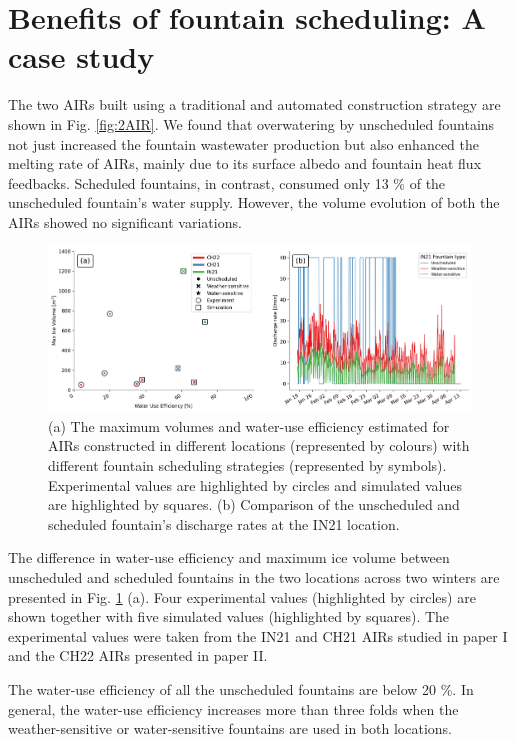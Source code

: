 \section{Benefits of fountain scheduling: A case study}

The two AIRs built using a traditional and automated construction strategy are shown in Fig. \ref{fig:2AIR}. We
found that overwatering by unscheduled fountains not just increased the fountain wastewater production but also
enhanced the melting rate of AIRs, mainly due to its surface albedo and fountain heat flux feedbacks. Scheduled
fountains, in contrast, consumed only 13 \% of the unscheduled fountain's water supply. However, the volume
evolution of both the AIRs showed no significant variations. 

\begin{figure}[htb]
\includegraphics[width=\textwidth]{figs/wue.png}

\caption{(a) The maximum volumes and water-use efficiency estimated for AIRs constructed in different locations
(represented by colours) with different fountain scheduling strategies (represented by symbols). Experimental
values are highlighted by circles and simulated values are highlighted by squares. (b) Comparison of
the unscheduled and scheduled fountain's discharge rates at the IN21 location.}

\label{fig:wue}
\end{figure}

The difference in water-use efficiency and maximum ice volume between unscheduled and scheduled fountains in the two
locations across two winters are presented in Fig. \ref{fig:wue} (a). Four experimental values (highlighted by
circles) are shown together with five simulated values (highlighted by squares).  The experimental values were
taken from the IN21 and CH21 AIRs studied in paper I and
the CH22 AIRs presented in paper II. 


The water-use efficiency of all the unscheduled fountains are below 20 \%. In general, the water-use efficiency
increases more than three folds when the weather-sensitive or water-sensitive fountains are used in both
locations.  

